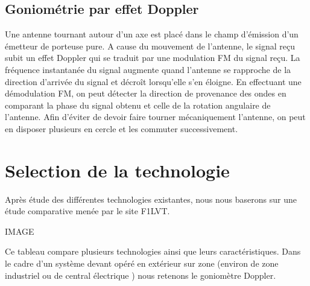 \subsection{Goniométrie par effet Doppler}

	Une antenne tournant autour d'un axe est placé dans le champ d'émission d'un émetteur de porteuse pure. A cause du mouvement de l'antenne, le signal reçu subit un effet Doppler qui se traduit par une modulation FM du signal reçu. La fréquence instantanée du signal augmente quand l’antenne se rapproche de la direction d’arrivée du signal et décroît lorsqu’elle s’en éloigne. En effectuant une démodulation FM, on peut détecter la direction de provenance des ondes en comparant la phase du signal obtenu et celle de la rotation angulaire de l’antenne. 
Afin d'éviter de devoir faire tourner mécaniquement l'antenne, on peut en disposer plusieurs en cercle et les commuter successivement.

\section{Selection de la technologie}

	Après étude des différentes technologies existantes, nous nous baserons sur une étude comparative menée par le site F1LVT.
	
	IMAGE
	
	Ce tableau compare plusieurs technologies ainsi que leurs caractéristiques. Dans le cadre d’un système devant opéré en extérieur sur zone (environ de zone industriel ou de central électrique ) nous retenons le goniomètre Doppler.





